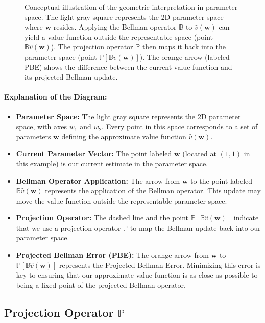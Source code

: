 \begin{figure}[ht]
\begin{tikzpicture}[scale=2, >=stealth, line join=round, line cap=round]
\end{tikzpicture}
\caption{Conceptual illustration of the geometric interpretation in parameter space. The light gray square represents the 2D parameter space where $\mathbf{w}$ resides. Applying the Bellman operator $\mathbb{B}$ to $\hat{v}(\mathbf{w})$ can yield a value function outside the representable space (point $\mathbb{B}\hat{v}(\mathbf{w})$). The projection operator $\mathbb{P}$ then maps it back into the parameter space (point $\mathbb{P}[\mathbb{B}\hat{v}(\mathbf{w})]$). The orange arrow (labeled PBE) shows the difference between the current value function and its projected Bellman update.}
\label{fig:param_space}
\end{figure}

\paragraph{Explanation of the Diagram:}
\begin{itemize}
    \item \textbf{Parameter Space:} The light gray square represents the 2D parameter space, with axes $w_1$ and $w_2$. Every point in this space corresponds to a set of parameters $\mathbf{w}$ defining the approximate value function $\hat{v}(\mathbf{w})$.
    \item \textbf{Current Parameter Vector:} The point labeled $\mathbf{w}$ (located at $(1,1)$ in this example) is our current estimate in the parameter space.
    \item \textbf{Bellman Operator Application:} The arrow from $\mathbf{w}$ to the point labeled $\mathbb{B}\hat{v}(\mathbf{w})$ represents the application of the Bellman operator. This update may move the value function outside the representable parameter space.
    \item \textbf{Projection Operator:} The dashed line and the point $\mathbb{P}[\mathbb{B}\hat{v}(\mathbf{w})]$ indicate that we use a projection operator $\mathbb{P}$ to map the Bellman update back into our parameter space.
    \item \textbf{Projected Bellman Error (PBE):} The orange arrow from $\mathbf{w}$ to $\mathbb{P}[\mathbb{B}\hat{v}(\mathbf{w})]$ represents the Projected Bellman Error. Minimizing this error is key to ensuring that our approximate value function is as close as possible to being a fixed point of the projected Bellman operator.
\end{itemize}

\subsection{Projection Operator \texorpdfstring{$\mathbb{P}$}{P}}

